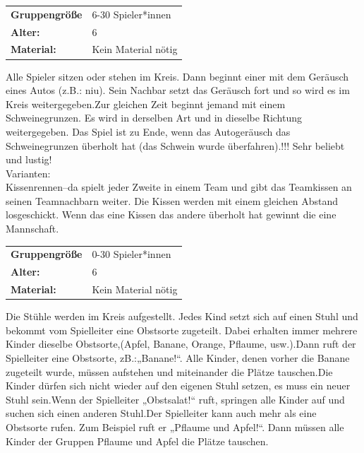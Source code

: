 \begin{table}[H]
\begin{tabular}{>{\bfseries}lp{8cm}}
   Gruppengröße   & 6-30 Spieler*innen\\
    Alter: & 6 \\ 
    Material: & Kein Material nötig\\ 
\end{tabular}
\end{table} 
Alle Spieler sitzen oder stehen im Kreis. Dann beginnt einer mit dem Geräusch eines Autos (z.B.: niu). Sein Nachbar setzt das Geräusch fort und so wird es im Kreis weitergegeben.Zur gleichen Zeit beginnt jemand mit einem Schweinegrunzen. Es wird in derselben Art und in dieselbe Richtung weitergegeben. Das Spiel ist zu Ende, wenn das Autogeräusch das Schweinegrunzen überholt hat (das Schwein wurde überfahren).!!! Sehr beliebt und lustig! \\ \newline
    Varianten: \\ Kissenrennen–da spielt jeder Zweite in einem Team und gibt das Teamkissen an seinen Teamnachbarn weiter. Die Kissen werden mit einem gleichen Abstand losgeschickt. Wenn das eine Kissen das andere überholt hat gewinnt die eine Mannschaft.\\


\begin{table}[H]
\begin{tabular}{>{\bfseries}lp{8cm}}
   Gruppengröße   & 0-30 Spieler*innen\\
    Alter: & 6 \\
    Material: & Kein Material nötig\\
\end{tabular}
\end{table} 
 Die Stühle werden im Kreis aufgestellt. Jedes Kind setzt sich auf einen Stuhl und bekommt vom Spielleiter eine Obstsorte zugeteilt. Dabei erhalten immer mehrere Kinder dieselbe Obstsorte,(Apfel, Banane, Orange, Pflaume, usw.).Dann ruft der Spielleiter eine Obstsorte, zB.:„Banane!“. Alle Kinder, denen vorher die Banane zugeteilt wurde, müssen aufstehen und miteinander die Plätze tauschen.Die Kinder dürfen sich nicht wieder auf den eigenen Stuhl setzen, es muss ein neuer Stuhl sein.Wenn der Spielleiter „Obstsalat!“ ruft, springen alle Kinder auf und suchen sich einen anderen Stuhl.Der Spielleiter kann auch mehr als eine Obstsorte rufen. Zum Beispiel ruft er „Pflaume und Apfel!“. Dann müssen alle Kinder der Gruppen Pflaume und Apfel die Plätze tauschen.\\



